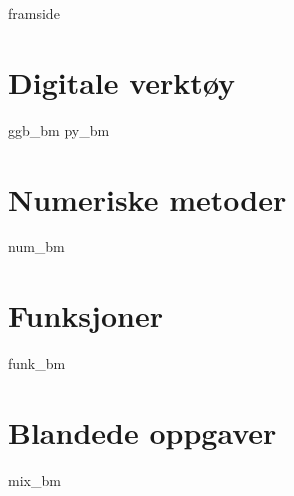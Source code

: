 





\addto\captionsenglish{\renewcommand{\contentsname}{Innhold}}


	
	{framside}
	
	{\footnotesize \tableofcontents}
	\newpage
	
	\chapter{Digitale verktøy}
	\newpage
	{ggb_bm}
	{py_bm}
	
	\chapter{Numeriske metoder}
	\newpage
	{num_bm}
	
	\chapter{Funksjoner}
	\newpage
	{funk_bm}
	
	\chapter{Blandede oppgaver}
	\newpage
	{mix_bm}	
	\newpage
	
	
	
	
	


	
	


